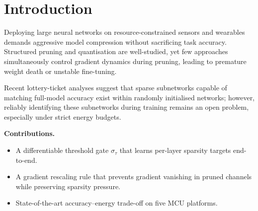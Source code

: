 \section{Introduction}

Deploying large neural networks on resource-constrained sensors and wearables
demands aggressive model compression without sacrificing task accuracy.
Structured pruning \cite{han2015deep} and quantisation \cite{jacob2018quantization}
are well-studied, yet few approaches simultaneously control gradient dynamics
during pruning, leading to premature weight death or unstable fine-tuning.

Recent lottery-ticket analyses \cite{frankle2019lottery} suggest that sparse
subnetworks capable of matching full-model accuracy exist within randomly
initialised networks; however, reliably identifying these subnetworks during
training remains an open problem, especially under strict energy budgets.

\textbf{Contributions.}
\begin{itemize}[leftmargin=1.2em,topsep=2pt,itemsep=1pt]
  \item A differentiable threshold gate $\sigma_\tau$ that learns per-layer
        sparsity targets end-to-end.
  \item A gradient rescaling rule that prevents gradient vanishing in pruned
        channels while preserving sparsity pressure.
  \item State-of-the-art accuracy–energy trade-off on five MCU platforms.
\end{itemize}

